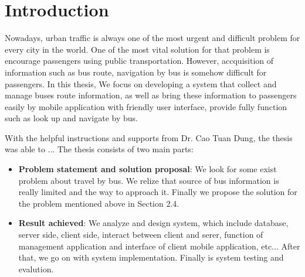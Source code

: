 \chapter{Introduction}
\label{ch:introduction}
Nowadays, urban traffic is always one of the most urgent and difficult problem for every city in the world. One of the most vital solution for that problem is encourage passengers using public transportation. However, accquisition of information such as bus route, navigation by bus is somehow difficult for passengers. 
In this thesis, We focus on developing a system that collect and manage buses route information, as well as bring these information to passengers easily by mobile application with friendly user interface, provide fully function such as look up and navigate by bus. 

With the helpful instructions and supports from Dr. Cao Tuan Dung, the thesis was able to ...
The thesis consists of two main parts:

\begin{itemize}
	\item \textbf{Problem statement and solution proposal}: We look for some exist problem about travel by bus. We relize that source of bus information is really limited and the way to approach it. Finally we propose the solution for the problem mentioned above in Section
2.4.	
	\item \textbf{Result achieved}: We analyze and design system, which include database, server side, client side, interact between client and serer, function of management application and interface of client mobile application, etc... After that, we go on with system implementation. Finally is system testing and evalution.
\end{itemize}


